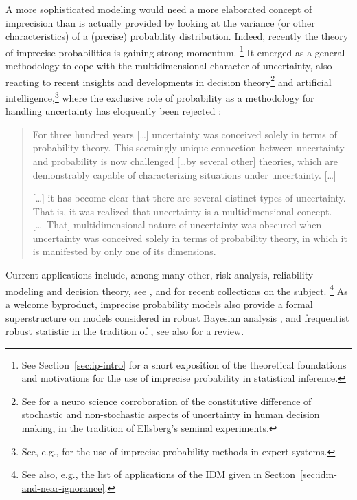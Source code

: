 A more sophisticated modeling would need a more elaborated concept
of imprecision than is actually provided by looking at the variance
(or other characteristics) of a (precise) probability distribution.
Indeed, recently the theory of imprecise probabilities \parencite{1991:walley,2001:weichselberger}
is gaining strong momentum.%
\footnote{See Section~\ref{sec:ip-intro} for a short exposition of the theoretical foundations
and motivations for the use of imprecise probability in statistical inference.}
It emerged as a general methodology to cope
with the multidimensional character of uncertainty, also reacting
to recent insights and developments in decision theory\footnote{See
\textcite{2005:hsu-bhatt} for a neuro science corroboration of the constitutive
difference of stochastic and non-stochastic aspects of uncertainty
in human decision making, in the tradition of Ellsberg's \parencite*{1961:ellsberg} seminal experiments.}
and artificial intelligence,\footnote{See, e.g., \textcite{1996:walley::expert}
for the use of imprecise probability methods in expert systems.}
where the exclusive role of probability
as a methodology for handling uncertainty has eloquently been rejected \parencite{1999:klir}:
\begin{quotation}
\begin{small}
For three hundred years [\ldots] uncertainty was conceived solely in
terms of probability theory. This seemingly unique connection
between uncertainty and probability is now challenged [\ldots by several
other] theories, which are demonstrably capable of characterizing
situations under uncertainty. [\ldots]

[\ldots] it has become clear that there are several distinct types of
uncertainty. That is, it was realized that uncertainty is a
multidimensional concept. [\ldots\ That] multidimensional nature of
uncertainty was obscured when uncertainty was conceived solely in
terms of probability theory, in which it is manifested by only one
of its dimensions.
\end{small}
\end{quotation}

Current applications include, among many other, risk analysis,
reliability modeling and decision theory, see \textcite{2009:ISIPTA},
\textcite{2011:ISIPTA} and \textcite{2009:CoolenSchrijner} for recent collections on the subject.%
\footnote{See also, e.g., the list of applications of the IDM given in Section~\ref{sec:idm-and-near-ignorance}.}
As a welcome byproduct, imprecise probability models also provide
a formal superstructure on models considered in robust Bayesian analysis \parencite{2000:rios}, and
frequentist robust statistic in the tradition of \textcite{1973:huberstrassen},
see also \textcite{2009:augustin-hable} for a review.

